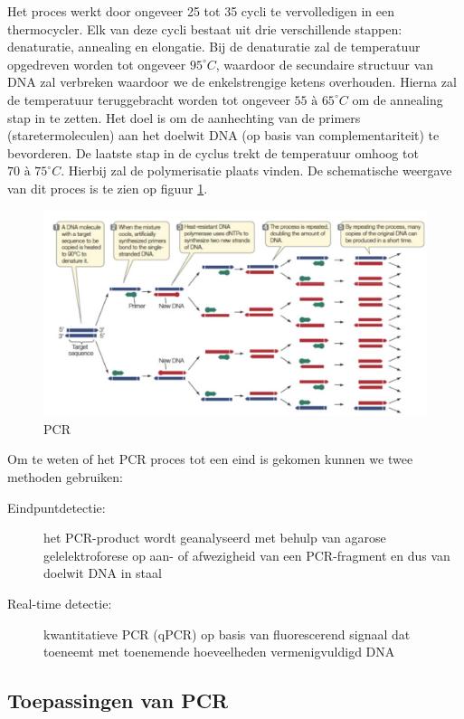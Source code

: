 \documentclass[a4paper,kul]{kulakarticle} %
\begin{document}
Het proces werkt door ongeveer 25 tot 35 cycli te vervolledigen in een thermocycler. Elk van deze cycli bestaat uit drie verschillende stappen: denaturatie, annealing en elongatie. Bij de denaturatie zal de temperatuur opgedreven worden tot ongeveer $95^\circ C$, waardoor de secundaire structuur van DNA zal verbreken waardoor we de enkelstrengige ketens overhouden. Hierna zal de temperatuur teruggebracht worden tot ongeveer $55 \text{ à } 65^\circ C$ om de annealing stap in te zetten. Het doel is om de aanhechting van de primers (staretermoleculen) aan het doelwit DNA (op basis van complementariteit) te bevorderen. De laatste stap in de cyclus trekt de temperatuur omhoog tot $70 \text{ à } 75^\circ C$. Hierbij zal de polymerisatie plaats vinden. De schematische weergave van dit proces is te zien op figuur \ref{fig:pcr}.
\newpage
\begin{figure}[h]
	\centering
	\includegraphics[width=0.7\linewidth]{PCR}
	\caption[PCR]{PCR}
	\label{fig:pcr}
\end{figure}
Om te weten of het PCR proces tot een eind is gekomen kunnen we twee methoden gebruiken:
\begin{description}
	\item[Eindpuntdetectie:] het PCR-product wordt geanalyseerd met behulp van agarose gelelektroforese op aan- of afwezigheid van een PCR-fragment en dus van doelwit DNA in staal
	\item[Real-time detectie:] kwantitatieve PCR (qPCR) op basis van	fluorescerend signaal dat toeneemt met toenemende hoeveelheden vermenigvuldigd DNA
\end{description}
\subsection{Toepassingen van PCR}
\end{document}
